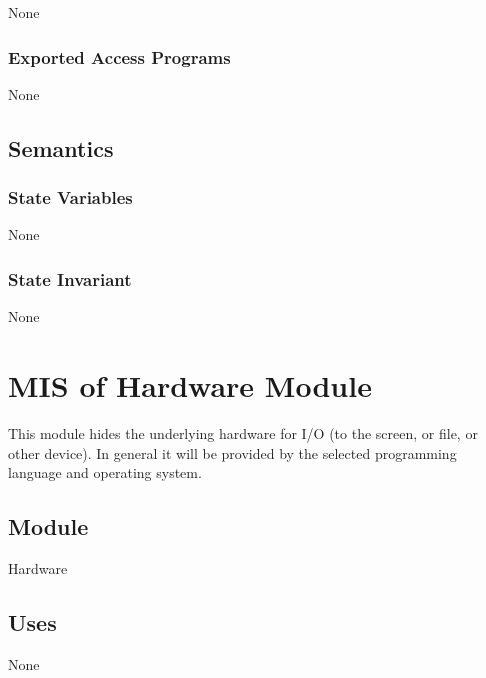 \documentclass[12pt, titlepage]{article}
\begin{document}
None

\subsubsection {Exported Access Programs}

None

\subsection {Semantics}

\subsubsection {State Variables}

None

\subsubsection {State Invariant}

None

\newpage


\section{MIS of Hardware Module} \label{Hardware}

This module hides the underlying hardware for I/O (to the screen, or file, or
other device).  In general it will be provided by the selected programming
language and operating system.

\subsection{Module}

Hardware

\subsection {Uses}

None
\end{document}
